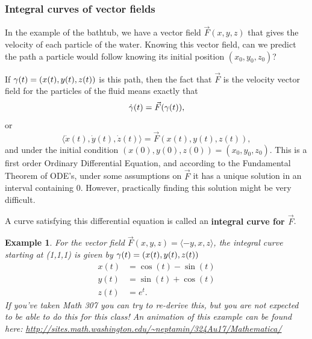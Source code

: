 \documentclass[12pt]{article}
\newcommand{\vF}{\vec{F}}
\renewcommand{\lg}{\langle}
\newcommand{\rg}{\rangle}
\newtheorem{example}{Example}
\begin{document}
\subsubsection*{Integral curves of vector fields}
In the example of the bathtub, we have a vector field $\vF(x,y,z)$ that gives the velocity of each particle of the water. Knowing this vector field, can we predict the path a particle would follow knowing its initial position $(x_0,y_0,z_0)$?

If $\gamma(t)=(x(t),y(t),z(t))$ is this path, then the fact that $\vF$ is the velocity vector field for the particles of the fluid means exactly that 
$$\dot{\g}(t)=\vF(\g(t)),$$
or $$\lg\dot{x}(t),\dot{y}(t),\dot{z}(t)\rg=\vF(x(t),y(t),z(t)),$$
and under the initial condition $(x(0),y(0),z(0))=(x_0,y_0,z_0)$.
This is a first order Ordinary Differential Equation, and according to the Fundamental Theorem of ODE's, under some assumptions on $\vF$ it has a unique solution in an interval containing 0. However, practically finding this solution might be very difficult.

A curve satisfying this differential equation is called an \textbf{integral curve for $\vF$}.
\begin{example}
For the vector field $\vF(x,y,z)=\lg -y,x,z\rg$, the integral curve starting at (1,1,1) is given by $\gamma(t)=(x(t),y(t),z(t))$ 
\begin{align*}
x(t)&=\cos(t)-\sin(t)\\
y(t)&=\sin(t)+\cos(t)\\
z(t)&=e^t.
\end{align*} If you've taken Math 307 you can try to re-derive this, but you are not expected to be able to do this for this class! An animation of this example can be found here: \url{http://sites.math.washington.edu/~neptamin/324Au17/Mathematica/}
\end{example}
\end{document}
